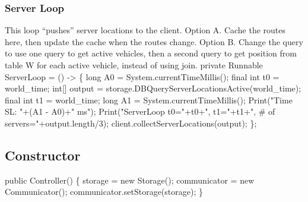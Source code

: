 \documentclass{article}
\def\nwendcode{\endtrivlist \endgroup}      %
\let\nwdocspar=\par
\begin{document}
\subsubsection{Server Loop}
This loop ``pushes'' server locations to the client.
Option A. Cache the routes here, then update the cache when the routes change.
Option B. Change the query to use one query to get active vehicles, then
  a second query to get position from table W for each active vehicle, instead
  of using join.
\nwenddocs{}\endmoddef{}
private Runnable ServerLoop = () -> \{
  long A0 = System.currentTimeMillis();
  final int t0 = world_time;
  int[] output = storage.DBQueryServerLocationsActive(world_time);
  final int t1 = world_time;
  long A1 = System.currentTimeMillis();
  Print("Time SL: "+(A1 - A0)+" ms");
  Print("ServerLoop t0="+t0+", t1="+t1+", # of servers="+output.length/3);
  client.collectServerLocations(output);
\};
\eatline
{}\nwendcode{}\nwdocspar
\subsection{Constructor}
\nwenddocs{}\endmoddef{}
public Controller() \{
  storage = new Storage();
  communicator = new Communicator();
  communicator.setStorage(storage);
\}
\nwendcode{}\nwdocspar
\end{document}
